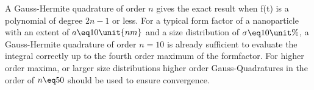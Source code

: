 \documentclass[\main/dresen_thesis.tex]{subfiles}
\begin{document}
A Gauss-Hermite quadrature of order $n$ gives the exact result when f(t) is a polynomial of degree $2n-1$ or less.
For a typical form factor of a nanoparticle with an extent of $a \eq 10 \unit{nm}$ and a size distribution of $\sigma \eq 10 \unit{\%}$, a Gauss-Hermite quadrature of order $n=10$ is already sufficient to evaluate the integral correctly up to the fourth order maximum of the formfactor.
For higher order maxima, or larger size distributions higher order Gauss-Quadratures in the order of $n\eq50$ should be used to ensure convergence.
\end{document}
